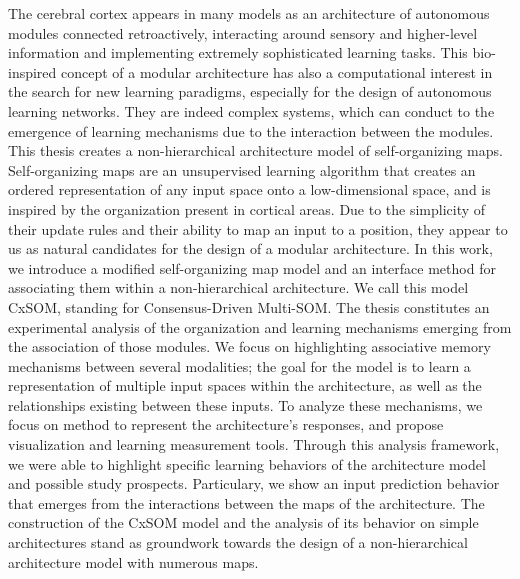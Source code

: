 \documentclass[11pt]{thesul-cs}
\begin{document}
\begin{ThesisAbstract}
\begin{FrenchAbstract}
  \end{FrenchAbstract}

  \begin{EnglishAbstract}
The cerebral cortex appears in many models as an architecture of autonomous modules connected retroactively, interacting around sensory and higher-level information and implementing extremely sophisticated learning tasks. 
This bio-inspired concept of a modular architecture has also a computational interest in the search for new learning paradigms, especially for the design of autonomous learning networks. They are indeed complex systems, which can conduct to the emergence of learning mechanisms due to the interaction between the modules.
This thesis creates a non-hierarchical architecture model of self-organizing maps.
Self-organizing maps are an unsupervised learning algorithm that creates an ordered representation of any input space onto a low-dimensional space, and is inspired by the organization present in cortical areas. 
Due to the simplicity of their update rules and their ability to map an input to a position, they appear to us as natural candidates for the design of a modular architecture.
In this work, we introduce a modified self-organizing map model and an interface method for associating them within a non-hierarchical architecture. We call this model CxSOM, standing for Consensus-Driven Multi-SOM.
The thesis constitutes an experimental analysis of the organization and learning mechanisms emerging from the association of those modules. 
We focus on highlighting associative memory mechanisms between several modalities; the goal for the model is to learn a representation of multiple input spaces within the architecture, as well as the relationships existing between these inputs.
To analyze these mechanisms, we focus on method to represent the architecture's responses, and propose visualization and learning measurement tools. Through this analysis framework, we were able to highlight specific learning behaviors of the architecture model and possible study prospects. Particulary, we show an input prediction behavior that emerges from the interactions between the maps of the architecture.
The construction of the CxSOM model and the analysis of its behavior on simple architectures stand as groundwork towards the design of a non-hierarchical architecture model with numerous maps.
   
    \end{EnglishAbstract}
  \end{ThesisAbstract}

\setcounter{tocdepth}{1}
\tableofcontents

\mainmatter










 \printbibliography
\end{document}
